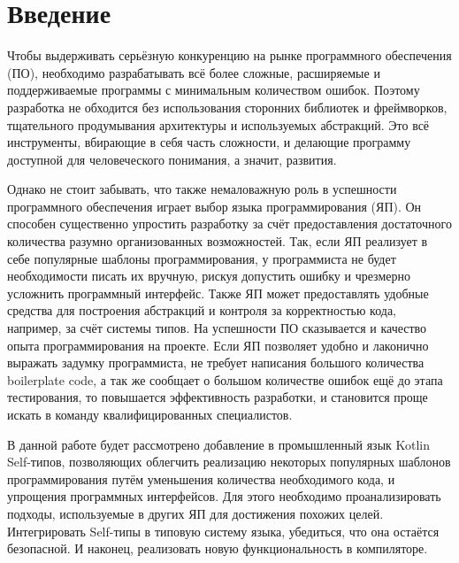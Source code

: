 \section*{Введение}

Чтобы выдерживать серьёзную конкуренцию на рынке программного обеспечения (ПО), необходимо разрабатывать всё более сложные, расширяемые и поддерживаемые программы с минимальным количеством ошибок.
Поэтому разработка не обходится без использования сторонних библиотек и фреймворков, тщательного продумывания архитектуры и используемых абстракций.
Это всё инструменты, вбирающие в себя часть сложности, и делающие программу доступной для человеческого понимания, а значит, развития.

Однако не стоит забывать, что также немаловажную роль в успешности программного обеспечения играет выбор языка программирования (ЯП).
Он способен существенно упростить разработку за счёт предоставления достаточного количества разумно организованных возможностей.
Так, если ЯП реализует в себе популярные шаблоны программирования, у программиста не будет необходимости писать их вручную, рискуя допустить ошибку и чрезмерно усложнить программный интерфейс.
Также ЯП может предоставлять удобные средства для построения абстракций и контроля за корректностью кода, например, за счёт системы типов.
На успешности ПО сказывается и качество опыта программирования на проекте.
Если ЯП позволяет удобно и лаконично выражать задумку программиста, не требует написания большого количества boilerplate code, а так же сообщает о большом количестве ошибок ещё до этапа тестирования, то повышается эффективность разработки, и становится проще искать в команду квалифицированных специалистов.

В данной работе будет рассмотрено добавление в промышленный язык Kotlin Self-типов, позволяющих облегчить реализацию некоторых популярных шаблонов программирования путём уменьшения количества необходимого кода, и упрощения программных интерфейсов.
Для этого необходимо проанализировать подходы, используемые в других ЯП для достижения похожих целей.
Интегрировать Self-типы в типовую систему языка, убедиться, что она остаётся безопасной.
И наконец, реализовать новую функциональность в компиляторе.
